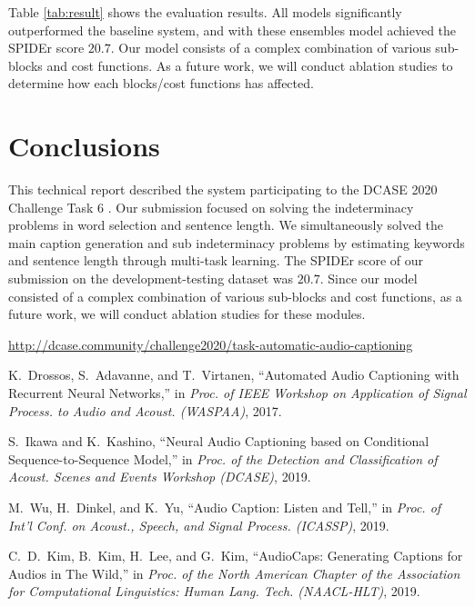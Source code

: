 \documentclass{article}
\begin{document}
\begin{sloppy}
Table \ref{tab:result} shows the evaluation results.
All models significantly outperformed the baseline system, and with these ensembles model achieved the SPIDEr score $20.7$.
Our model consists of a complex combination of various sub-blocks and cost functions.
As a future work, we will conduct ablation studies to determine how each blocks/cost functions has affected.




\section{Conclusions}

This technical report described the system participating to the DCASE 2020 Challenge Task 6 \cite{task}. Our submission focused on solving the indeterminacy problems in word selection and sentence length. We simultaneously solved the main caption generation and sub indeterminacy problems by estimating keywords and sentence length through multi-task learning. The SPIDEr score of our submission on the development-testing dataset was $20.7$. Since our model consisted of a complex combination of various sub-blocks and cost functions, as a future work, we will conduct ablation studies for these modules.



\newpage
\begin{thebibliography}{99}
 \url{http://dcase.community/challenge2020/task-automatic-audio-captioning}


 K.\ Drossos, S.\ Adavanne, and T.\ Virtanen,
``Automated Audio Captioning with Recurrent Neural Networks,''
in \textit{Proc. of IEEE Workshop on Application of Signal Process. to Audio and Acoust. (WASPAA)}, 2017.

 S.\ Ikawa and K.\ Kashino,
``Neural Audio Captioning based on Conditional Sequence-to-Sequence Model,''
in \textit{Proc. of the Detection and Classification of Acoust. Scenes and Events Workshop (DCASE)}, 2019.

 M.\ Wu, H.\ Dinkel, and K.\ Yu,
``Audio Caption: Listen and Tell,''
in \textit{Proc. of Int'l Conf. on Acoust., Speech, and Signal Process. (ICASSP)}, 2019.

 C.\ D.\ Kim, B.\ Kim, H.\ Lee, and G.\ Kim,
``AudioCaps: Generating Captions for Audios in The Wild,''
in \textit{Proc. of the North American Chapter of the Association for Computational Linguistics: Human Lang. Tech. (NAACL-HLT)}, 2019.


\end{thebibliography}
\end{sloppy}
\end{document}
